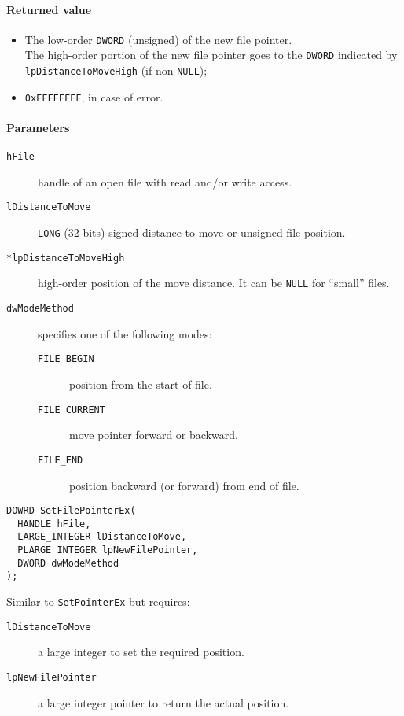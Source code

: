 \paragraph{Returned value}
\begin{itemize}
\item The low-order \texttt{DWORD} (unsigned) of the new file pointer. \\ The high-order portion of the new file pointer goes to the \texttt{DWORD} indicated by \texttt{lpDistanceToMoveHigh} (if non-\texttt{NULL});
\item \texttt{0xFFFFFFFF}, in case of error.
\end{itemize}

\paragraph{Parameters}
\begin{description}
\item [\texttt{hFile}] handle of an open file with read and/or write access.
\item [\texttt{lDistanceToMove}] \texttt{LONG} (32 bits) signed distance to move or unsigned file position.
\item [\texttt{*lpDistanceToMoveHigh}] high-order position of the move distance. It can be \texttt{NULL} for ``small'' files.
\item [\texttt{dwModeMethod}] specifies one of the following modes:
\begin{description}
\item [\texttt{FILE\_BEGIN}] position from the start of file.
\item [\texttt{FILE\_CURRENT}] move pointer forward or backward.
\item [\texttt{FILE\_END}] position backward (or forward) from end of file.
\end{description}
\end{description}

\begin{verbatim}
DOWRD SetFilePointerEx(
  HANDLE hFile,
  LARGE_INTEGER lDistanceToMove,
  PLARGE_INTEGER lpNewFilePointer,
  DWORD dwModeMethod
);
\end{verbatim}

Similar to \texttt{SetPointerEx} but requires:
\begin{description}
\item [\texttt{lDistanceToMove}] a large integer to set the required position.
\item [\texttt{lpNewFilePointer}] a large integer pointer to return the actual position.
\end{description}

